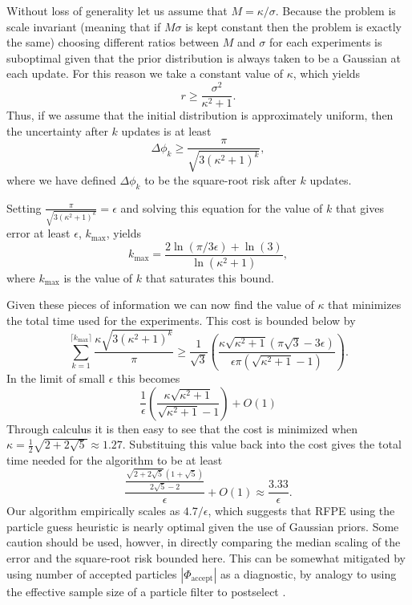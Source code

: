 \documentclass[aps,pra,amsmath,twocolumn,amssymb,superscriptaddress]{revtex4-1}
\begin{document}
Without loss of generality let us assume that $M=\kappa/\sigma$.  Because the problem is scale invariant (meaning that if $M\sigma$ is kept constant then the problem is exactly the same) choosing different ratios between $M$ and $\sigma$ for each experiments is suboptimal given that the prior distribution is always taken to be a Gaussian at each update.  For this reason we take a constant value of $\kappa$, which yields
\begin{equation}
    r \ge \frac{\sigma^2}{\kappa^2 +1}.
\end{equation}
Thus, if we assume that the initial distribution is approximately uniform, then the uncertainty
after $k$ updates is at least
\begin{equation}
    \Delta \phi_k \ge \frac{\pi}{\sqrt{3(\kappa^2+1)^k}},
\end{equation}
where we have defined $\Delta \phi_k$ to be the square-root risk after $k$ updates.

Setting $\frac{\pi}{\sqrt{3(\kappa^2+1)^k}} = \epsilon$ and solving this equation for the value of $k$ that gives error at least $\epsilon$, $k_{\max}$, yields
\begin{equation}
k_{\max} = \frac{2\ln(\pi/3\epsilon)+\ln(3)}{\ln(\kappa^2 +1)},
\end{equation}
where $k_{\max}$ is the value of $k$ that saturates this bound.  

Given these pieces of information we can now find the value of $\kappa$ that minimizes the total time used for the experiments.
This cost is bounded below by
\begin{equation}
\sum_{k=1}^{\lceil k_{\max}\rceil} \frac{\kappa \sqrt{3(\kappa^2+1)^k} }{\pi} \ge \frac{1}{\sqrt{3}}\left(\frac{\kappa \sqrt{\kappa^2+1}(\pi \sqrt{3} -3 \epsilon)}{\epsilon \pi(\sqrt{\kappa^2+1}-1)} \right).
\end{equation}
In the limit of small $\epsilon$ this becomes
\begin{equation}
\frac{1}{\epsilon}\left(\frac{\kappa\sqrt{\kappa^2 +1}}{\sqrt{\kappa^2+1}-1}\right)+O(1)
\end{equation}
Through calculus it is then easy to see that the cost is minimized when $\kappa = \frac{1}{2} \sqrt{2 + 2 \sqrt{5}}\approx 1.27$.  Substituing this value back into the cost gives the total time needed for the algorithm to be at least
\begin{equation}
\frac{\frac{\sqrt{2 + 2 \sqrt{5}} (1+\sqrt{5})}{2\sqrt{5}-2}}{\epsilon}+O(1) \approx \frac{3.33}{\epsilon}.
\end{equation}
Our algorithm empirically scales as $4.7/\epsilon$, which suggests that RFPE using the particle guess heuristic is nearly optimal given the use of Gaussian priors. Some caution should be used, howver,
in directly comparing the median scaling of the error and the square-root risk
bounded here. This can be somewhat mitigated by using number of accepted particles
$|\Phi_{\text{accept}}|$ as a diagnostic, by analogy to using the effective sample
size of a particle filter to postselect \cite{hybrid_tomo_supp_mat}.
\end{document}
